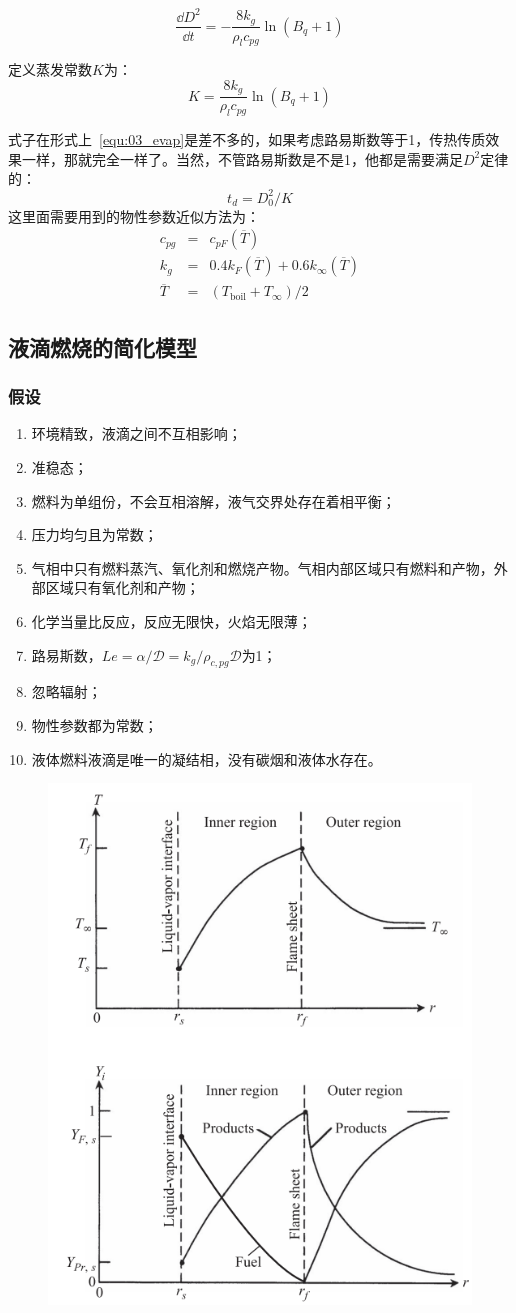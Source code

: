 \begin{equation}
    \frac{\dd D^2}{\dd t} = -\frac{8 k_g}{\rho_l c_{pg}}\ln(B_q + 1)
\end{equation}

定义蒸发常数\(K\)为：
\begin{equation}
    K = \frac{8 k_g}{\rho_l c_{pg}}\ln(B_q + 1)
\end{equation}

式子在形式上~\ref{equ:03_evap}是差不多的，如果考虑路易斯数等于1，传热传质效果一样，那就完全一样了。当然，不管路易斯数是不是1，他都是需要满足\(D^2\)定律的：
\begin{equation}
    t_d=D_0^2/K
\end{equation}
这里面需要用到的物性参数近似方法为：
\begin{eqnarray}
    c_{pg} &=& c_{pF}(\overline{T})\\
    k_g &=& 0.4 k_F(\overline{T})+0.6 k_\infty(\overline{T})\\
    \overline{T}&=& (T_\mathrm{boil} + T_\infty)/2
\end{eqnarray}

\subsection{液滴燃烧的简化模型}
\subsubsection{假设}
\begin{enumerate}
    \item 环境精致，液滴之间不互相影响；
    \item 准稳态；
    \item 燃料为单组份，不会互相溶解，液气交界处存在着相平衡；
    \item 压力均匀且为常数；
    \item 气相中只有燃料蒸汽、氧化剂和燃烧产物。气相内部区域只有燃料和产物，外部区域只有氧化剂和产物；
    \item 化学当量比反应，反应无限快，火焰无限薄；
    \item 路易斯数，\(Le=\alpha/\mathcal{D}=k_g/\rho_{c,pg}\mathcal{D}\)为1；
    \item 忽略辐射；
    \item 物性参数都为常数；
    \item 液体燃料液滴是唯一的凝结相，没有碳烟和液体水存在。
\end{enumerate}

\begin{figure}[H]
    \centering
    \includegraphics[width=.3\textwidth]{img/drop.png}
\end{figure}

